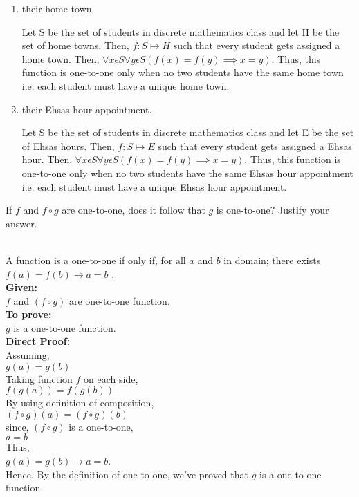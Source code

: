 \documentclass[addpoints]{exam}
\begin{document}
\begin{questions}
\begin{enumerate}[label=\alph*)]
\begin{solution}
    \end{solution}
  \item their home town.
    \begin{solution}
      Let S be the set of students in discrete mathematics class and let H be the set of home towns. Then, $f: S \mapsto H$ such that every student gets assigned a home town. 
      Then, $\forall x \epsilon S \forall y \epsilon S (f(x) = f(y) \implies x = y) $. Thus, this function is one-to-one only when no two students have the same home town i.e. each student must have a unique home town.
    \end{solution}
  \item their Ehsas hour appointment.
    \begin{solution}
      Let S be the set of students in discrete mathematics class and let E be the set of Ehsas hours. Then, $f: S \mapsto E$ such that every student gets assigned a Ehsas hour. 
      Then, $\forall x \epsilon S \forall y \epsilon S (f(x) = f(y) \implies x = y) $. Thus, this function is one-to-one only when no two students have the same Ehsas hour appointment i.e. each student must have a unique Ehsas hour appointment.
    \end{solution}
  \end{enumerate}


\question[5] If $f$ and $f \circ g$ are one-to-one, does it follow that $g$ is one-to-one? Justify your answer.
  \begin{solution}\\
    A function is a one-to-one if only if, for all $a$ and $b$ in domain; there exists $f(a) = f(b) \rightarrow a = b$ .\\
    \textbf{Given:}\\
    $f$ and $(f \circ g)$ are one-to-one function.\\
    \textbf{To prove:}\\
    $g$ is a one-to-one function.\\
    \textbf{Direct Proof:}\\
    Assuming,\\
    $g(a) = g(b)$\\
    Taking function $f$ on each side,\\
    $f(g(a)) = f(g(b))$\\
    By using definition of composition,\\
    $(f \circ g)(a) = (f \circ g)(b)$\\
    since, $(f \circ g)$ is a one-to-one,\\
    $a = b$\\
    Thus,\\
    $g(a) = g(b) \rightarrow a = b$.\\
    Hence,
    By the definition of one-to-one, we've proved that $g$ is a one-to-one function.
  \end{solution}


\end{questions}
\end{document}
